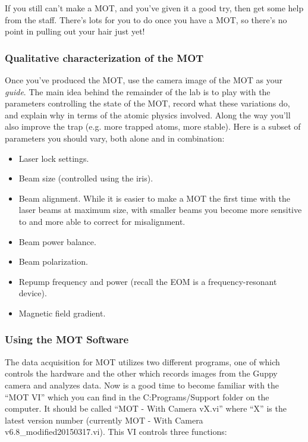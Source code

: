 \documentclass{../lab}
\begin{document}
If you still can't make a MOT, and you've given it a good try, then get some help from the staff. There's lots for you to do once you have a MOT, so there's no point in pulling out your hair just yet!

\subsubsection{Qualitative characterization of the MOT}

Once you've produced the MOT, use the camera image of the MOT as your \emph{guide}. The main idea behind the remainder of the lab is to play with the parameters controlling the state of the MOT, record what these variations do, and explain why in terms of the atomic physics involved. Along the way you'll also improve the trap (e.g. more trapped atoms, more stable). Here is a subset of parameters you should vary, both alone and in combination:

\begin{itemize}
    \item Laser lock settings.

    \item Beam size (controlled using the iris).

    \item Beam alignment. While it is easier to make a MOT the first time with the laser beams at maximum size, with smaller beams you become more sensitive to and more able to correct for misalignment.

    \item Beam power balance.

    \item Beam polarization.

    \item Repump frequency and power (recall the EOM is a frequency-resonant device).

    \item Magnetic field gradient.
\end{itemize}


\subsubsection{Using the MOT Software}

The data acquisition for MOT utilizes two different programs, one of which controls the hardware and the other which records images from the Guppy camera and analyzes data. Now is a good time to become familiar with the ``MOT VI'' which you can find in the C:Programs/Support folder on the computer. It should be called ``MOT - With Camera vX.vi'' where ``X'' is the latest version number (currently MOT - With Camera v6.8\_modified20150317.vi). This VI controls three functions:
\end{document}
